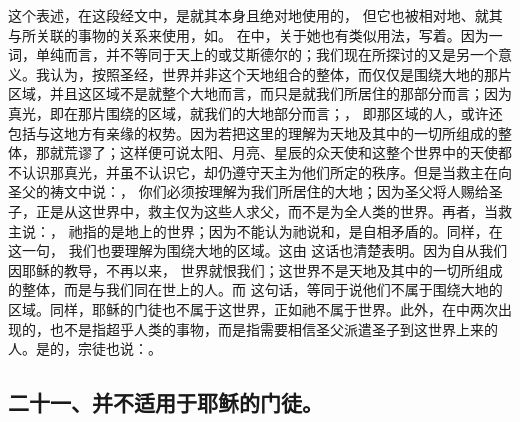  这个表述，在这段经文中，是就其本身且绝对地使用的， 但它也被相对地、就其与所关联的事物的关系来使用，如。 在中，关于她也有类似用法，写着。因为一词，单纯而言，并不等同于天上的或艾斯德尔的；我们现在所探讨的又是另一个意义。我认为，按照圣经，世界并非这个天地组合的整体，而仅仅是围绕大地的那片区域，并且这区域不是就整个大地而言，而只是就我们所居住的那部分而言；因为真光，即在那片围绕的区域，就我们的大地部分而言；， 即那区域的人，或许还包括与这地方有亲缘的权势。因为若把这里的理解为天地及其中的一切所组成的整体，那就荒谬了；这样便可说太阳、月亮、星辰的众天使和这整个世界中的天使都不认识那真光，并虽不认识它，却仍遵守天主为他们所定的秩序。但是当救主在向圣父的祷文中说：， 你们必须按理解为我们所居住的大地；因为圣父将人赐给圣子，正是从这世界中，救主仅为这些人求父，而不是为全人类的世界。再者，当救主说：， 祂指的是地上的世界；因为不能认为祂说和，是自相矛盾的。同样，在这一句， 我们也要理解为围绕大地的区域。这由 这话也清楚表明。因为自从我们因耶稣的教导，不再以来， 世界就恨我们；这世界不是天地及其中的一切所组成的整体，而是与我们同在世上的人。而 这句话，等同于说他们不属于围绕大地的区域。同样，耶稣的门徒也不属于这世界，正如祂不属于世界。此外，在中两次出现的，也不是指超乎人类的事物，而是指需要相信圣父派遣圣子到这世界上来的人。是的，宗徒也说：。\par


\subsection{二十一、并不适用于耶稣的门徒。}

